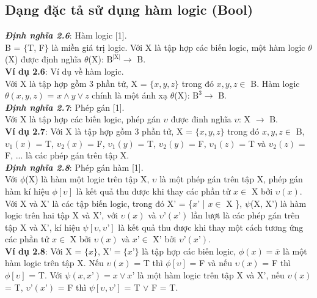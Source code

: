 \documentclass[a4paper,13pt,oneside,openany]{book}
\begin{document}
\begin{flushleft}
		\section{Dạng đặc tả sử dụng hàm logic (Bool)}
		\textbf{\textit{Định nghĩa 2.6}}: Hàm logic [1].\\
		B = $\{$T, F$\}$ là miền giá trị logic. Với X là tập hợp các biến logic, một hàm logic $\theta$(X) được định nghĩa $\theta$(X): $\textrm{B}^\textrm{{|X|}} \rightarrow$ B.\\
		\textbf{Ví dụ 2.6}: Ví dụ về hàm logic.\\
		Với X là tập hợp gồm 3 phần tử, X = $\{x, y, z\}$ trong đó $x, y, z \in$ B. Hàm logic $\theta(x, y, z)$ = $x \land y \lor z$ chính là một ánh xạ $\theta$(X): $\textrm{B}^3 \rightarrow$ B.\\
		\textbf{\textit{Định nghĩa 2.7}}: Phép gán [1].\\
		Với X là tập hợp các biến logic, phép gán $\upsilon$ được đinh nghĩa $\upsilon$: X $\rightarrow$ B.\\
		\textbf{Ví dụ 2.7}: Với X là tập hợp gồm 3 phần tử, X = $\{x, y, z\}$ trong đó $x, y, z \in$ B, $\upsilon_1(x)$ = T, $\upsilon_2(x)$ = F, $\upsilon_1(y)$ = T, $\upsilon_2(y)$ = F, $\upsilon_1(z)$ = T và $\upsilon_2(z)$ = F, ... là các phép gán trên tập X.\\
		\textbf{\textit{Định nghĩa 2.8}}: Phép gán hàm [1].\\
		Với $\phi$(X) là hàm một logic trên tập X, $\upsilon$ là một phép gán trên tập X, phép gán hàm kí hiệu $\phi[\upsilon]$ là kết quả thu được khi thay các phần tử $x \in$ X bởi $\upsilon(x)$.
		Với X và $\textrm{X'}$ là các tập biến logic, trong đó $\textrm{X'}$ = \{$x\textrm{'}$ | $x \in$ X \}, $\psi$(X, $\textrm{X'}$) là hàm logic trên hai tập X và $\textrm{X'}$, với $\upsilon(x)$ và $\upsilon\textrm{'}(x\textrm{'})$ lần lượt là các phép gán trên tập X và $\textrm{X'}$, kí hiệu $\psi[\upsilon, \upsilon\textrm{'}]$ là kết quả thu được khi thay một cách tương ứng các phần tử $x \in$ X bởi $\upsilon(x)$ và $x\textrm{'} \in$ $\textrm{X'}$ bởi $\upsilon\textrm{'}(x\textrm{'})$.\\
		\textbf{Ví dụ 2.8}: Với X = $\{x\}$, $\textrm{X'} = \{x\textrm{'}\}$ là tập hợp các biến logic, $\phi(x) = \overline{x}$ là một hàm logic trên tập X. Nếu $\upsilon(x)$ = T thì $\phi[\upsilon]$ = F và nếu $\upsilon(x)$ = F thì $\phi[\upsilon]$ = T. Với $\psi(x, x\textrm{'}) = x \lor x\textrm{'}$ là một hàm logic trên tập X và $\textrm{X'}$, nếu $\upsilon(x)$ = T, $\upsilon\textrm{'}(x\textrm{'})$ = F thì $\psi[\upsilon, \upsilon\textrm{'}]$ = T $\lor$ F = T.\\

\end{flushleft}
\end{document}
